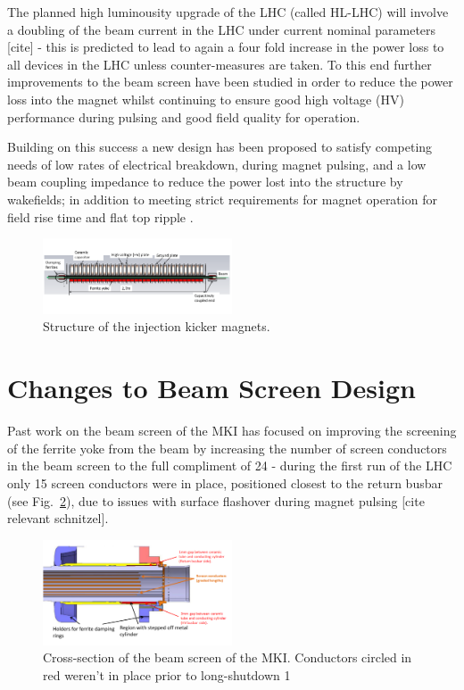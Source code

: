 \documentclass[a4paper,
              ]{jacow}
\begin{document}
The planned high luminousity upgrade of the LHC (called HL-LHC) will involve a doubling of the beam current in the LHC under current nominal parameters [cite] - this is predicted to lead to again a four fold increase in the power loss to all devices in the LHC unless counter-measures are taken. To this end further improvements to the beam screen have been studied in order to reduce the power loss into the magnet whilst continuing to ensure good high voltage (HV) performance during pulsing and good field quality for operation.

Building on this success a new design has been proposed to satisfy competing needs of low rates of electrical breakdown, during magnet pulsing, and a low beam coupling impedance to reduce the power lost into the structure by wakefields; in addition to meeting strict requirements for magnet operation for field rise time and flat top ripple \cite{mkiUpgrade}. 

\begin{figure}
\includegraphics[width=0.5\textwidth]{MKICrossSectionYZ.pdf}
\caption{Structure of the injection kicker magnets.}
\label{fig:mkiStruct}
\end{figure}

\section{Changes to Beam Screen Design}

Past work on the beam screen of the MKI has focused on improving the screening of the ferrite yoke from the beam by increasing the number of screen conductors in the beam screen to the full compliment of 24 - during the first run of the LHC only 15 screen conductors were in place, positioned closest to the return busbar (see Fig.~\ref{fig:LengthWiseSlice}), due to issues with surface flashover during magnet pulsing [cite relevant schnitzel]. 

\begin{figure}
\begin{center}
\includegraphics[width=0.5\textwidth]{beamScreenCrossSectionLabelled.pdf}
\caption{Cross-section of the beam screen of the MKI. Conductors circled in red weren't in place prior to long-shutdown 1}
\label{fig:LengthWiseSlice}
\end{center}
\end{figure}
\end{document}

